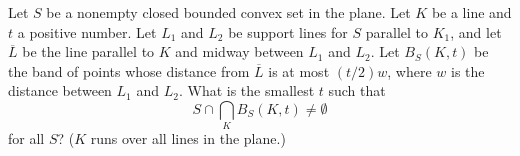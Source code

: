 Let $S$ be a nonempty closed bounded convex set in the plane.
Let $K$ be a line and $t$ a positive number. Let $L_1$ and $L_2$ be
support lines for $S$ parallel to $K_1$, and let $\overline{L}$ be the
line parallel to $K$ and midway between $L_1$ and $L_2$. Let $B_S(K, t)$
be the band of points whose distance from $\overline{L}$ is at most
$(t/2)w$, where $w$ is the distance between $L_1$ and $L_2$. What is the
smallest $t$ such that
\[
S \cap \bigcap_K B_S(K, t) \neq \emptyset
\]
for all $S$? ($K$ runs over all lines in the plane.)
